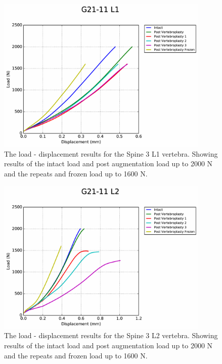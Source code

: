 \begin{figure}[ht!]
  \centering
  \includegraphics[width=4in]{Chapters/Chapter_HT_images/G21-11_L1.pdf}
  \caption{The load - displacement results for the Spine 3 L1 vertebra. Showing
    results of the intact load and post augmentation load up to 2000 N and the
    repeats and frozen load up to 1600 N.}
  \label{fig:Spine3_L1}
\end{figure}

\begin{figure}[ht!]
  \centering
  \includegraphics[width=4in]{Chapters/Chapter_HT_images/G21-11_L2.pdf}
  \caption{The load - displacement results for the Spine 3 L2 vertebra. Showing
    results of the intact load and post augmentation load up to 2000 N and the
    repeats and frozen load up to 1600 N.}
  \label{fig:Spine3_L2}
\end{figure}

